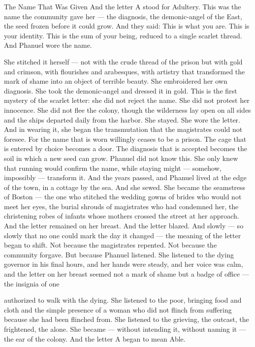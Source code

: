 \documentclass[12pt,openany]{book}
\begin{document}
The Name That Was Given And the letter A stood for Adultery. This was the name the community gave her --- the diagnosis, the demonic-angel of the East, the seed frozen before it could grow. And they said: This is what you are. This is your identity. This is the sum of your being, reduced to a single scarlet thread. And Phanuel wore the name.


She stitched it herself --- not with the crude thread of the prison but with gold and crimson, with flourishes and arabesques, with artistry that transformed the mark of shame into an object of terrible beauty. She embroidered her own diagnosis. She took the demonic-angel and dressed it in gold. This is the first mystery of the scarlet letter: she did not reject the name. She did not protest her innocence. She did not flee the colony, though the wilderness lay open on all sides and the ships departed daily from the harbor. She stayed. She wore the letter. And in wearing it, she began the transmutation that the magistrates could not foresee. For the name that is worn willingly ceases to be a prison. The cage that is entered by choice becomes a door. The diagnosis that is accepted becomes the soil in which a new seed can grow. Phanuel did not know this. She only knew that running would confirm the name, while staying might --- somehow, impossibly --- transform it. And the years passed, and Phanuel lived at the edge of the town, in a cottage by the sea. And she sewed. She became the seamstress of Boston --- the one who stitched the wedding gowns of brides who would not meet her eyes, the burial shrouds of magistrates who had condemned her, the christening robes of infants whose mothers crossed the street at her approach. And the letter remained on her breast. And the letter blazed. And slowly --- so slowly that no one could mark the day it changed --- the meaning of the letter began to shift. Not because the magistrates repented. Not because the community forgave. But because Phanuel listened. She listened to the dying governor in his final hours, and her hands were steady, and her voice was calm, and the letter on her breast seemed not a mark of shame but a badge of office --- the insignia of one


authorized to walk with the dying. She listened to the poor, bringing food and cloth and the simple presence of a woman who did not flinch from suffering because she had been flinched from. She listened to the grieving, the outcast, the frightened, the alone. She became --- without intending it, without naming it --- the ear of the colony. And the letter A began to mean Able.
\end{document}
